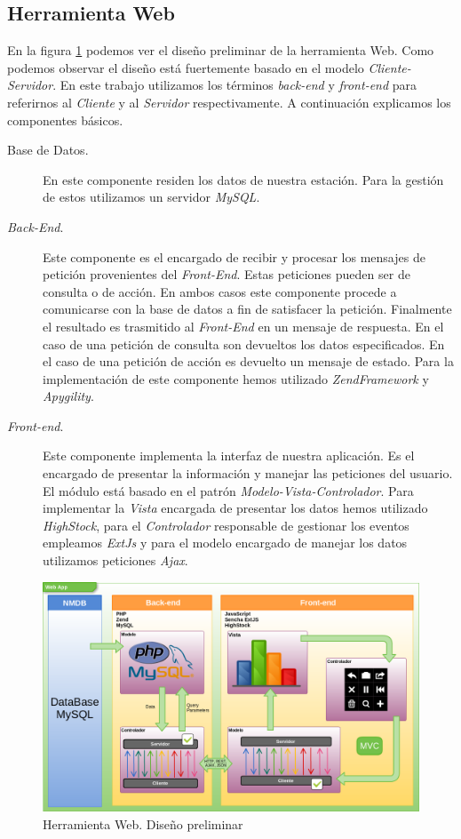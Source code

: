 	\subsection{Herramienta Web}
		En la figura \ref{fig:herramienta_web_preliminar} podemos ver el diseño preliminar de la herramienta Web. Como podemos observar el
		diseño está fuertemente basado en el modelo \emph{Cliente-Servidor}\cite{MVCWiki}. En este trabajo utilizamos los términos
		\emph{back-end} y \emph{front-end} para referirnos al \emph{Cliente} y al \emph{Servidor} respectivamente. A continuación explicamos los componentes
		básicos.
		\begin{description}
			\item[Base de Datos.]    
				En este componente residen los datos de nuestra estación. Para la gestión de estos utilizamos un servidor
				\emph{MySQL}\cite{MySql}.
			\item[\emph{Back-End}.]
				Este componente es el encargado de recibir y procesar los mensajes de petición provenientes del \emph{Front-End}.
				Estas peticiones pueden ser de consulta o de acción. En ambos casos este componente procede a comunicarse con la base
				de datos a fin de satisfacer la petición. Finalmente el resultado es trasmitido al \emph{Front-End} en un mensaje de
				respuesta. En el caso de una petición de consulta son devueltos los datos especificados. En el caso de una petición de
				acción es devuelto un mensaje de estado. Para la implementación de este componente hemos utilizado
				\emph{ZendFramework}\cite{ZF} y \emph{Apygility}\cite{Apigility}.
			\item[\emph{Front-end}.] 
				Este componente implementa la interfaz de nuestra aplicación. Es el encargado de presentar la información y manejar
				las peticiones del usuario. El módulo está basado en el patrón \emph{Modelo-Vista-Controlador}. Para implementar la
				\emph{Vista} encargada de presentar los datos hemos utilizado \emph{HighStock}\cite{HighStock}, para el
				\emph{Controlador} responsable de gestionar los eventos empleamos \emph{ExtJs}\cite{ExtJs} y para el modelo encargado
				de manejar los datos utilizamos peticiones \emph{Ajax}\cite{AjaxWiki}.
		\end{description}
		\begin{figure}[h]
			\centering
			\includegraphics[keepaspectratio, width=1\textwidth]{./img/herramienta_web_preliminar.png}
			\caption{Herramienta Web. Diseño preliminar}
			\label{fig:herramienta_web_preliminar}
		\end{figure}
